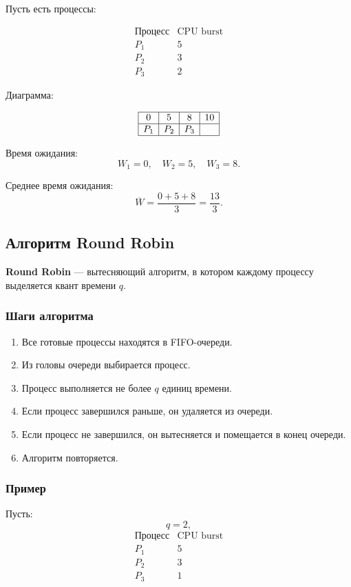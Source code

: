 \documentclass[12pt,a4paper]{article}
\begin{document}
Пусть есть процессы:

\[
\begin{array}{c|c}
\text{Процесс} & \text{CPU burst} \\
\hline
P_1 & 5 \\
P_2 & 3 \\
P_3 & 2
\end{array}
\]

Диаграмма:

\[
\begin{array}{|c|c|c|c|}
\hline
0 & 5 & 8 & 10 \\
\hline
P_1 & P_2 & P_3 & \\
\hline
\end{array}
\]


Время ожидания:
\[
W_1 = 0,\quad W_2 = 5,\quad W_3 = 8.
\]

Среднее время ожидания:
\[
\overline{W} = \frac{0 + 5 + 8}{3} = \frac{13}{3}.
\]

\subsection{Алгоритм Round Robin}

\textbf{Round Robin} --- вытесняющий алгоритм, в котором каждому процессу выделяется квант времени $q$.

\subsubsection*{Шаги алгоритма}

\begin{enumerate}
    \item Все готовые процессы находятся в FIFO-очереди.
    \item Из головы очереди выбирается процесс.
    \item Процесс выполняется не более $q$ единиц времени.
    \item Если процесс завершился раньше, он удаляется из очереди.
    \item Если процесс не завершился, он вытесняется и помещается в конец очереди.
    \item Алгоритм повторяется.
\end{enumerate}

\subsubsection*{Пример}

Пусть:
\[
q = 2,
\]
\[
\begin{array}{c|c}
\text{Процесс} & \text{CPU burst} \\
\hline
P_1 & 5 \\
P_2 & 3 \\
P_3 & 1
\end{array}
\]
\end{document}
